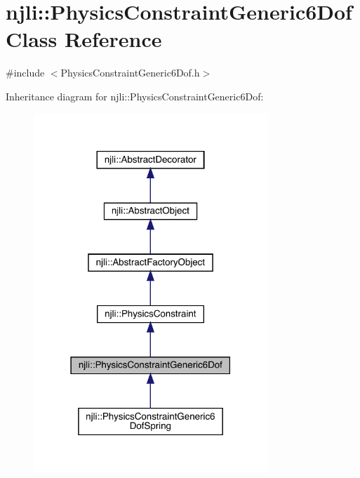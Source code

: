 \hypertarget{classnjli_1_1_physics_constraint_generic6_dof}{}\section{njli\+:\+:Physics\+Constraint\+Generic6\+Dof Class Reference}
\label{classnjli_1_1_physics_constraint_generic6_dof}


{\ttfamily \#include $<$Physics\+Constraint\+Generic6\+Dof.\+h$>$}



Inheritance diagram for njli\+:\+:Physics\+Constraint\+Generic6\+Dof\+:\nopagebreak
\begin{figure}[H]
\begin{center}
\leavevmode
\includegraphics[width=250pt]{classnjli_1_1_physics_constraint_generic6_dof__inherit__graph}
\end{center}
\end{figure}


